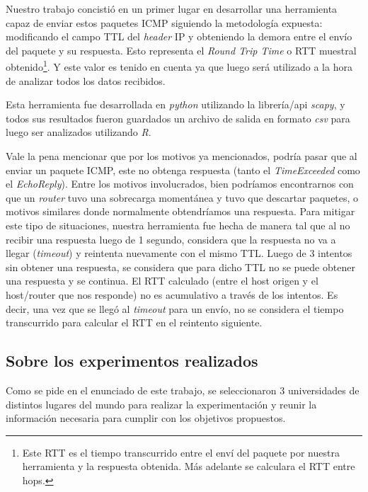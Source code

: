 \par Nuestro trabajo concisti\'o en un primer lugar en desarrollar una
herramienta capaz de enviar estos paquetes ICMP siguiendo la metodolog\'ia
expuesta: modificando el campo TTL del \textit{header} IP y obteniendo la demora
entre el env\'io del paquete y su respuesta. Esto representa el \textit{Round
Trip Time} o RTT muestral obtenido\footnote{Este RTT es el tiempo transcurrido
entre el env\'i del paquete por nuestra herramienta y la respuesta obtenida.
M\'as adelante se calculara el RTT entre hops.}. Y este valor es tenido en
cuenta ya que luego ser\'a utilizado a la hora de analizar todos los datos
recibidos.

\par Esta herramienta fue desarrollada en \textit{python}\cite{python}
utilizando la librer\'ia/api \textit{scapy}\cite{scapy}, y todos sus resultados
fueron guardados un archivo de salida en formato \textit{csv}\cite{csv} para
luego ser analizados utilizando \textit{R}\cite{R}.

\par Vale la pena mencionar que por los motivos ya mencionados, podr\'ia pasar
que al enviar un paquete ICMP, este no obtenga respuesta (tanto el \textit{%
TimeExceeded} como el \textit{EchoReply}). Entre los motivos involucrados, bien
podr\'iamos encontrarnos con que un \textit{router} tuvo una sobrecarga
moment\'anea y tuvo que descartar paquetes, o motivos similares donde
normalmente obtendr\'iamos una respuesta. Para mitigar este tipo de situaciones,
nuestra herramienta fue hecha de manera tal que al no recibir una respuesta
luego de 1 segundo, considera que la respuesta no va a llegar (\textit{timeout})
y reintenta nuevamente con el mismo TTL. Luego de 3 intentos sin obtener una
respuesta, se considera que para dicho TTL no se puede obtener una respuesta
y se continua. El RTT calculado (entre el host origen y el host/router que nos
responde) no es acumulativo a trav\'es de los intentos. Es decir, una vez que
se lleg\'o al \textit{timeout} para un env\'io, no se considera el tiempo
transcurrido para calcular el RTT en el reintento siguiente.


\subsection*{Sobre los experimentos realizados}
\par Como se pide en el enunciado de este trabajo, se seleccionaron 3
universidades de distintos lugares del mundo para realizar la experimentaci\'on
y reunir la informaci\'on necesaria para cumplir con los objetivos propuestos.

